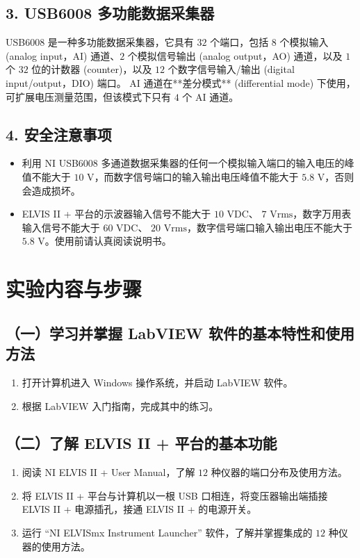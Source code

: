 \documentclass[a4paper,8pt,twocolumn]{article}
\begin{document}
\subsection*{3. USB6008 多功能数据采集器}
USB6008 是一种多功能数据采集器，它具有 $32$ 个端口，包括 $8$ 个模拟输入 (analog input，AI) 通道、$2$ 个模拟信号输出 (analog output，AO) 通道，以及 $1$ 个 $32$ 位的计数器 (counter)，以及 $12$ 个数字信号输入/输出 (digital input/output，DIO) 端口。
AI 通道在**差分模式** (differential mode) 下使用，可扩展电压测量范围，但该模式下只有 $4$ 个 AI 通道。

\subsection*{4. 安全注意事项}
\begin{itemize}
    \item 利用 NI USB6008 多通道数据采集器的任何一个模拟输入端口的输入电压的峰值不能大于 $\text{10 V}$，而数字信号端口的输入输出电压峰值不能大于 $\text{5.8 V}$，否则会造成损坏。
    \item ELVIS II + 平台的示波器输入信号不能大于 $\text{10 VDC}$、 $\text{7 Vrms}$，数字万用表输入信号不能大于 $\text{60 VDC}$、 $\text{20 Vrms}$，数字信号端口输入输出电压不能大于 $\text{5.8 V}$。使用前请认真阅读说明书。
\end{itemize}

\section*{实验内容与步骤}
\subsection*{（一）学习并掌握 LabVIEW 软件的基本特性和使用方法}
\begin{enumerate}
    \item 打开计算机进入 Windows 操作系统，并启动 LabVIEW 软件。
    \item 根据 LabVIEW 入门指南，完成其中的练习。
\end{enumerate}

\subsection*{（二）了解 ELVIS II + 平台的基本功能}
\begin{enumerate}
    \item 阅读 NI ELVIS II + User Manual，了解 $12$ 种仪器的端口分布及使用方法。
    \item 将 ELVIS II + 平台与计算机以一根 USB 口相连，将变压器输出端插接 ELVIS II + 电源插孔，接通 ELVIS II + 的电源开关。
    \item 运行 “NI ELVISmx Instrument Launcher” 软件，了解并掌握集成的 $12$ 种仪器的使用方法。
\end{enumerate}
\end{document}
